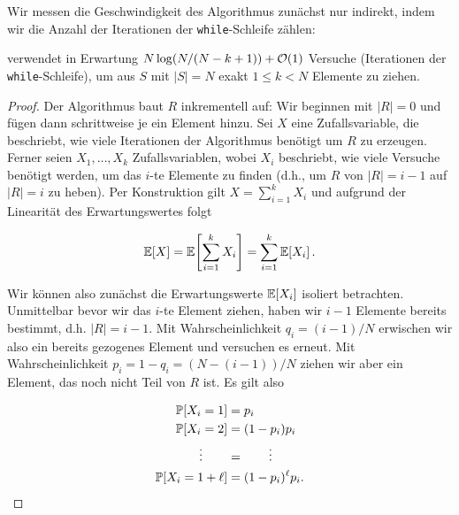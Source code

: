 \bigskip

Wir messen die Geschwindigkeit des Algorithmus zunächst nur indirekt, indem wir die Anzahl der Iterationen der \texttt{while}-Schleife zählen:

\begin{lemma}\label{lemma:basis-ziehen-ohne-zuruecklegen-versuche}
     verwendet in Erwartung $N \log(N/(N-k+1)) + \mathcal{O}\!\left(1\right)$ Versuche (Iterationen der \texttt{while}-Schleife), um aus $S$ mit $|S| = N$ exakt $1 \le k < N$ Elemente zu ziehen.
\end{lemma}

\begin{proof}
    Der Algorithmus baut $R$ inkrementell auf: Wir beginnen mit $|R| = 0$ und fügen dann schrittweise je ein Element hinzu.
    Sei $X$ eine Zufallsvariable, die beschriebt, wie viele Iterationen der Algorithmus benötigt um $R$ zu erzeugen.
    Ferner seien $X_1, \ldots, X_k$ Zufallsvariablen, wobei $X_i$ beschriebt, wie viele Versuche benötigt werden, um das $i$-te Elemente zu finden (d.h., um $R$ von $|R| = i - 1$ auf  $|R| = i$ zu heben).
    Per Konstruktion gilt $X = \sum_{i=1}^k X_i$ und aufgrund der Linearität des Erwartungswertes folgt

    \begin{equation}
        \mathbb{E}\!\left[X\right] = \mathbb{E}\!\left[\sum_{i=1}^k X_i\right] = \sum_{i=1}^k \mathbb{E}\!\left[X_i\right]. \label{eq:basis-ziehen-ohne-zuruecklegen_expvX}
    \end{equation}

    Wir können also zunächst die Erwartungswerte $\mathbb{E}\!\left[X_i\right]$ isoliert betrachten.
    Unmittelbar bevor wir das $i$-te Element ziehen, haben wir $i-1$ Elemente bereits bestimmt, d.h. $|R| = i - 1$.
    Mit Wahrscheinlichkeit $q_i = (i-1) / N$ erwischen wir also ein bereits gezogenes Element und versuchen es erneut.
    Mit Wahrscheinlichkeit $p_i = 1 - q_i = (N - (i - 1)) / N$ ziehen wir aber ein Element, das noch nicht Teil von $R$ ist.
    Es gilt also

    \begin{align*}
        \mathbb{P}\!\left[X_i = 1\right]            & = p_i                  \\
        \mathbb{P}\!\left[X_i = 2\right]            & = (1 -p_i) p_i         \\
        \vdots         \quad\quad & = \quad\quad \vdots    \\
        \mathbb{P}\!\left[X_i = 1 + \ell\right]     & = (1- p_i)^{\ell} p_i.
    \end{align*}


\end{proof}
